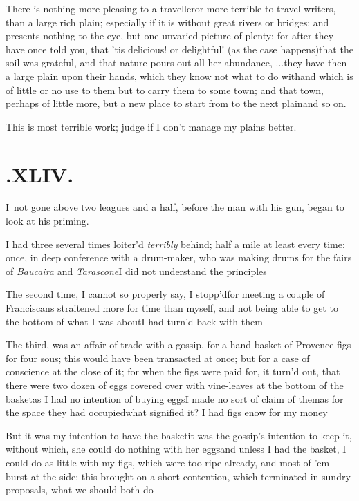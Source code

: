 \documentclass{article}
\begin{document}
There is nothing more pleasing to a traveller\tsh or
more terrible to travel-writers, than a large rich plain;
especially if it is without great rivers or bridges; and presents
nothing to the eye, but one unvaried picture of plenty: for after
they have once told you, that ’tis delicious! or delightful!
(as the case happens)\tsk that the soil was grateful, and that
nature pours out all her abundance, \etc .\@ .\@ .\@ they
have then a large plain upon their hands, which they know not
what to do with\tsk and which is of little or no use to them but
to carry them to some town; and that town, perhaps of little
more, but a new place to start from to the next plain\tsh and so
on.

\tsh This is most terrible work; judge if I don’t manage
my plains better.

\section{.\enspace XLIV.}

\lettrine{I}{\,} not gone above two leagues and
a half, before the man with his gun, began to look at his
priming.

I had three several times loiter’d \textit{terribly} behind;
half a mile at least every time: once, in deep conference with a
drum-maker, who was making drums for the fairs of \textit{Baucaira}
and \textit{Tarascone}\tsk I did not understand the
principles\tsh{}

The second time, I cannot so properly say, I
stopp’d\tsh for meeting a couple of
Franciscans straitened more for time than myself, and not
being able to get to the bottom of what I was about\tsh I
had turn’d back with them\tsh

The third, was an affair of trade with a gossip, for a
hand basket of Provence figs for four sous; this would have
been transacted at once; but for a case of conscience at the close
of it; for when the figs were paid for, it turn’d out,
that there were two dozen of eggs covered over with
vine-leaves at the bottom of the basket\tsk as I had no intention
of buying eggs\tsk I made no sort of claim of them\tsk as for
the space they had occupied\tsk what signified it? I had figs
enow for my money\tsh{}

\tsh But it was my intention to have the basket\tsk it was
the gossip’s intention to keep it, without which, she could
do nothing with her eggs\tsh and unless I had the basket,
I could do as little with my figs, which were too ripe already, and
most of ’em burst at the side: this brought on a short
contention, which terminated in sundry proposals, what we should
both do\tsh
\end{document}
